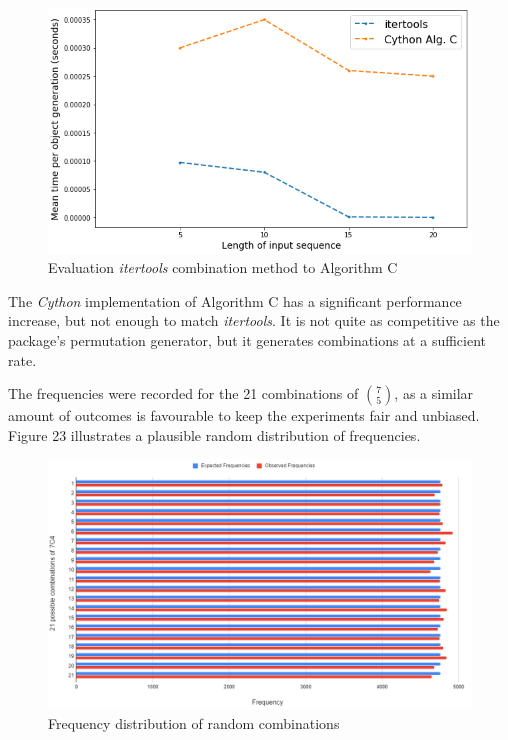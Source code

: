 \documentclass[12pt]{article}
\begin{document}
\begin{figure}[h]
\centering
\includegraphics[width=1.0\textwidth]{images/comb_graph2.PNG}
\caption{Evaluation \textit{itertools} combination method to Algorithm C \cite{comb_C}}
\end{figure}

\pagebreak

The \textit{Cython} implementation of Algorithm C has a significant performance increase, but not enough to match \textit{itertools}. It is not quite as competitive as the package's permutation generator, but it generates combinations at a sufficient rate.

The frequencies were recorded for the 21 combinations of \(7 \choose 5\), as a similar amount of outcomes is favourable to keep the experiments fair and unbiased. Figure 23 illustrates a plausible random distribution of frequencies.

\begin{figure}[h]
\centering
\includegraphics[width=1.0\textwidth]{images/comb_freq.PNG}
\caption{Frequency distribution of random combinations \cite{rand_comb}}
\end{figure}
\end{document}
